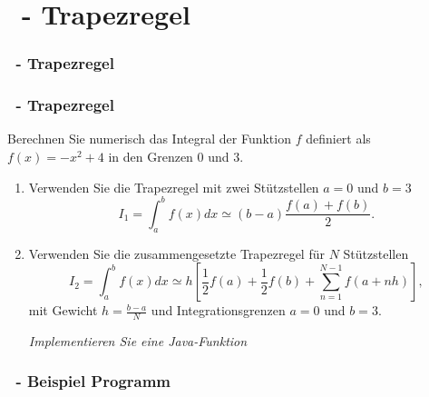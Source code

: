 \def\stitle{\theexercise\ - Trapezregel}
\section{\stitle}
\begin{frame}
  \frametitle{\stitle}%
\tableofcontents[current]
\end{frame}


\begin{frame}[fragile]%
    \frametitle{\stitle}

Berechnen Sie numerisch das Integral der Funktion $f$ definiert als $f(x) = -x^2+4$ in den Grenzen $0$ und $3$.
\begin{enumerate}
\item Verwenden Sie die Trapezregel mit zwei St\"utzstellen $a=0$ und $b=3$
\[
I_1
= \int_a^b f(x)dx
\simeq (b-a)\frac{f(a)+f(b)}{2}
.\]
\item Verwenden Sie die zusammengesetzte Trapezregel für $N$ St\"utzstellen
\[
I_2
= \int_a^b f(x)dx
\simeq h \left[\frac{1}{2}f(a)+\frac{1}{2}f(b)+\sum_{n=1}^{N-1}f\left(a+nh \right)\right]
,\]
mit Gewicht $h = \frac{b-a}{N}$ und Integrationsgrenzen $a=0$ und $b=3$.

\emph{Implementieren Sie eine Java-Funktion}

\end{enumerate}

\end{frame}


\begin{frame}[t]%
  \frametitle{\theexercise\ - Beispiel Programm}%


\end{frame}
